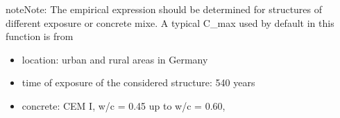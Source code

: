 \documentclass[letterpaper,10pt,english]{sphinxmanual}
\begin{document}
\begin{fulllineitems}
\begin{quote}
\begin{description}
\end{description}\end{quote}

\begin{sphinxadmonition}{note}{Note:}
\sphinxAtStartPar
The empirical expression should be determined for structures of different exposure or concrete mixe.
A typical C\_max used by default in this function is from
\begin{itemize}
\item {} 
\sphinxAtStartPar
location: urban and rural areas in Germany

\item {} 
\sphinxAtStartPar
time of exposure of the considered structure: 5\sphinxhyphen{}40 years

\item {} 
\sphinxAtStartPar
concrete: CEM I, w/c = 0.45 up to w/c = 0.60,

\end{itemize}
\end{sphinxadmonition}

\end{fulllineitems}

\end{document}
